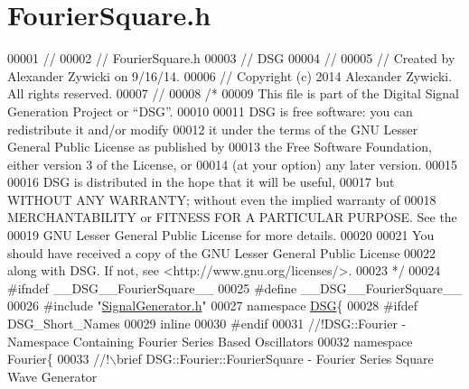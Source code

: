 \hypertarget{_fourier_square_8h_source}{\section{Fourier\+Square.\+h}
\label{_fourier_square_8h_source}
}

\begin{DoxyCode}
00001 \textcolor{comment}{//}
00002 \textcolor{comment}{//  FourierSquare.h}
00003 \textcolor{comment}{//  DSG}
00004 \textcolor{comment}{//}
00005 \textcolor{comment}{//  Created by Alexander Zywicki on 9/16/14.}
00006 \textcolor{comment}{//  Copyright (c) 2014 Alexander Zywicki. All rights reserved.}
00007 \textcolor{comment}{//}
00008 \textcolor{comment}{/*}
00009 \textcolor{comment}{ This file is part of the Digital Signal Generation Project or “DSG”.}
00010 \textcolor{comment}{}
00011 \textcolor{comment}{ DSG is free software: you can redistribute it and/or modify}
00012 \textcolor{comment}{ it under the terms of the GNU Lesser General Public License as published by}
00013 \textcolor{comment}{ the Free Software Foundation, either version 3 of the License, or}
00014 \textcolor{comment}{ (at your option) any later version.}
00015 \textcolor{comment}{}
00016 \textcolor{comment}{ DSG is distributed in the hope that it will be useful,}
00017 \textcolor{comment}{ but WITHOUT ANY WARRANTY; without even the implied warranty of}
00018 \textcolor{comment}{ MERCHANTABILITY or FITNESS FOR A PARTICULAR PURPOSE.  See the}
00019 \textcolor{comment}{ GNU Lesser General Public License for more details.}
00020 \textcolor{comment}{}
00021 \textcolor{comment}{ You should have received a copy of the GNU Lesser General Public License}
00022 \textcolor{comment}{ along with DSG.  If not, see <http://www.gnu.org/licenses/>.}
00023 \textcolor{comment}{ */}
00024 \textcolor{preprocessor}{#ifndef \_\_DSG\_\_FourierSquare\_\_}
00025 \textcolor{preprocessor}{#define \_\_DSG\_\_FourierSquare\_\_}
00026 \textcolor{preprocessor}{#include "\hyperlink{_signal_generator_8h}{SignalGenerator.h}"}
00027 \textcolor{keyword}{namespace }\hyperlink{namespace_d_s_g}{DSG}\{
00028 \textcolor{preprocessor}{#ifdef DSG\_Short\_Names}
00029     \textcolor{keyword}{inline}
00030 \textcolor{preprocessor}{#endif}
00031 \textcolor{comment}{    //!DSG::Fourier - Namespace Containing Fourier Series Based Oscillators}
00032 \textcolor{comment}{}    \textcolor{keyword}{namespace }Fourier\{\textcolor{comment}{}
00033 \textcolor{comment}{        //!\(\backslash\)brief DSG::Fourier::FourierSquare - Fourier Series Square Wave Generator}

\end{DoxyCode}
